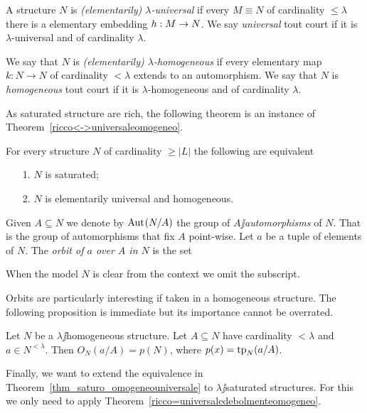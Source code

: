 \documentclass[creche.tex]{subfiles}
\begin{document}
\begin{definition}
A structure $N$ is \emph{(elementarily) $\lambda$-universal\/} if every $M\equiv N$ of cardinality $\le\lambda$ there is a elementary embedding $h:M\rightarrow N$. We say  \emph{universal\/} tout court if it is $\lambda$-universal and of cardinality $\lambda$.

We say that $N$ is \emph{(elementarily) $\lambda$-homogeneous\/} if every elementary map $k:N\to N$ of cardinality $<\lambda$ extends to an automorphism. We say that $N$ is \emph{homogeneous\/} tout court if it is $\lambda$-homogeneous and of cardinality $\lambda$.\QED
\end{definition}

As saturated structure are rich, the following theorem is an instance of Theorem~\ref{ricco<->universaleomogeneo}.

\begin{theorem}\label{thm_saturo_omogeneouniversale}
For every structure $N$ of cardinality $\ge|L|$ the following are equivalent\nobreak
\begin{itemize}
\item[1.] $N$ is saturated;
\item[2.] $N$ is elementarily universal and homogeneous.\QED
\end{itemize}
\end{theorem}

Given $A\subseteq N$ we denote by \emph{$\textrm{Aut\kern.15ex}(N/A)$\/} the group of \emph{$A\jj$automorphisms\/} of $N$. That is the group of automorphisms that fix $A$ point-wise. Let $a$ be a tuple of elements of $N$. The \emph{orbit of $a$ over $A$ in $N$} is the set


When the model $N$ is clear from the context we omit the subscript.

Orbits are particularly interesting if taken in a homogeneous structure. The following proposition is immediate but its importance cannot be overrated.

\begin{proposition}\label{omogeneitaorbitetipi}
Let $N$ be a $\lambda\jj$homogeneous structure. Let $A\subseteq N$ have cardinality $<\lambda$ and $a\in N^{<\lambda}$. Then $O_N(a/A)=p(N)$, where $p(x)={\rm tp}_N(a/A)$.\QED
\end{proposition}


Finally, we want to extend the equivalence in Theorem~\ref{thm_saturo_omogeneouniversale} to $\lambda\jj$saturated structures. For this we only need to apply Theorem~\ref{ricco=universaledebolmenteomogeneo}. 
\end{document}
